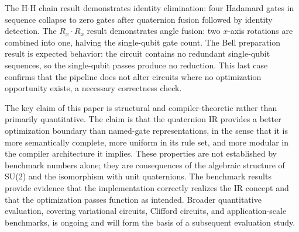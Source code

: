 \documentclass[conference]{IEEEtran}
\begin{document}
\begin{table}[htbp]
\caption{Benchmark Results Summary}
\begin{center}
\label{tab:results}
\end{center}
\end{table}

The H$\cdot$H chain result demonstrates identity elimination: four Hadamard gates in
sequence collapse to zero gates after quaternion fusion followed by identity detection.
The $R_x \cdot R_x$ result demonstrates angle fusion: two $x$-axis rotations are combined
into one, halving the single-qubit gate count. The Bell preparation result is expected
behavior: the circuit contains no redundant single-qubit sequences, so the single-qubit
passes produce no reduction. This last case confirms that the pipeline does not alter
circuits where no optimization opportunity exists, a necessary correctness check.

The key claim of this paper is structural and compiler-theoretic rather than primarily
quantitative. The claim is that the quaternion IR provides a better optimization boundary
than named-gate representations, in the sense that it is more semantically complete,
more uniform in its rule set, and more modular in the compiler architecture it implies.
These properties are not established by benchmark numbers alone; they are consequences
of the algebraic structure of SU(2) and the isomorphism with unit quaternions. The
benchmark results provide evidence that the implementation correctly realizes the IR
concept and that the optimization passes function as intended. Broader quantitative
evaluation, covering variational circuits, Clifford circuits, and application-scale
benchmarks, is ongoing and will form the basis of a subsequent evaluation study.
\end{document}
